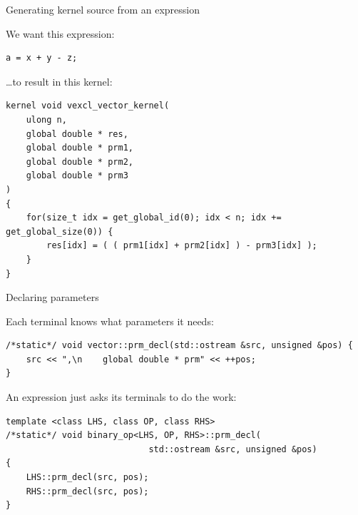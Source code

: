 \documentclass[@BEAMER_OPTIONS@]{beamer}
\begin{document}
\begin{frame}[fragile]{Generating kernel source from an expression}
    \begin{exampleblock}{We want this expression:}
        \begin{lstlisting}
a = x + y - z;
        \end{lstlisting}
    \end{exampleblock}
    \begin{exampleblock}{\ldots to result in this kernel:}
        \begin{lstlisting}
kernel void vexcl_vector_kernel(
    ulong n,
    global double * res,
    global double * prm1,
    global double * prm2,
    global double * prm3
)
{
    for(size_t idx = get_global_id(0); idx < n; idx += get_global_size(0)) {
        res[idx] = ( ( prm1[idx] + prm2[idx] ) - prm3[idx] );
    }
}
        \end{lstlisting}
    \end{exampleblock}
\end{frame}

\note{ }

\begin{frame}[fragile]{Declaring parameters}
    \begin{exampleblock}{Each terminal knows what parameters it needs:}
        \begin{lstlisting}
/*static*/ void vector::prm_decl(std::ostream &src, unsigned &pos) {
    src << ",\n    global double * prm" << ++pos;
}
        \end{lstlisting}
    \end{exampleblock}
    \begin{exampleblock}{An expression just asks its terminals to do the work:}
        \begin{lstlisting}[firstnumber=last]
template <class LHS, class OP, class RHS>
/*static*/ void binary_op<LHS, OP, RHS>::prm_decl(
                            std::ostream &src, unsigned &pos)
{
    LHS::prm_decl(src, pos);
    RHS::prm_decl(src, pos);
}
        \end{lstlisting}
    \end{exampleblock}
\end{frame}
\end{document}
